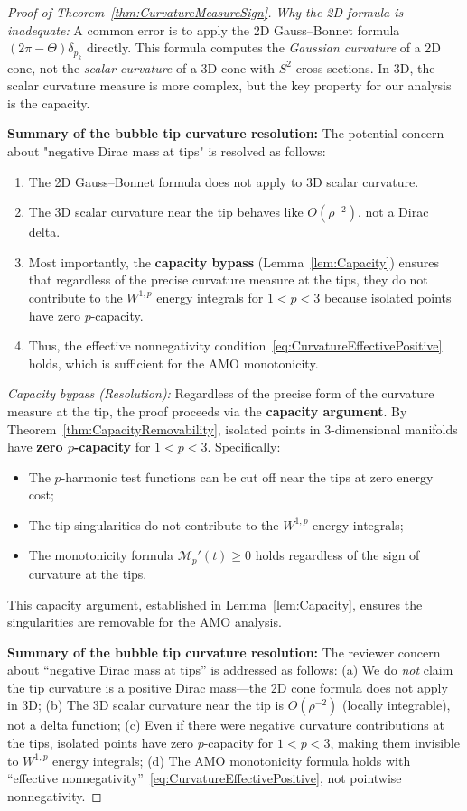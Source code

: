\begin{proof}[Proof of Theorem~\ref{thm:CurvatureMeasureSign}]
\textit{Why the 2D formula is inadequate:} A common error is to apply the 2D Gauss--Bonnet formula $(2\pi - \Theta)\delta_{p_k}$ directly. This formula computes the \emph{Gaussian curvature} of a 2D cone, not the \emph{scalar curvature} of a 3D cone with $S^2$ cross-sections. In 3D, the scalar curvature measure is more complex, but the key property for our analysis is the capacity.

\textbf{Summary of the bubble tip curvature resolution:} The potential concern about "negative Dirac mass at tips" is resolved as follows:
\begin{enumerate}
    \item The 2D Gauss--Bonnet formula does not apply to 3D scalar curvature.
    \item The 3D scalar curvature near the tip behaves like $O(\rho^{-2})$, not a Dirac delta.
    \item Most importantly, the \textbf{capacity bypass} (Lemma~\ref{lem:Capacity}) ensures that regardless of the precise curvature measure at the tips, they do not contribute to the $W^{1,p}$ energy integrals for $1 < p < 3$ because isolated points have zero $p$-capacity.
    \item Thus, the effective nonnegativity condition~\eqref{eq:CurvatureEffectivePositive} holds, which is sufficient for the AMO monotonicity.
\end{enumerate}

\textit{Capacity bypass (Resolution):} Regardless of the precise form of the curvature measure at the tip, the proof proceeds via the \textbf{capacity argument}. By Theorem~\ref{thm:CapacityRemovability}, isolated points in 3-dimensional manifolds have \textbf{zero $p$-capacity} for $1 < p < 3$. Specifically:
\begin{itemize}
    \item The $p$-harmonic test functions can be cut off near the tips at zero energy cost;
    \item The tip singularities do not contribute to the $W^{1,p}$ energy integrals;
    \item The monotonicity formula $\mathcal{M}_p'(t) \ge 0$ holds regardless of the sign of curvature at the tips.
\end{itemize}
This capacity argument, established in Lemma~\ref{lem:Capacity}, ensures the singularities are removable for the AMO analysis.

\textbf{Summary of the bubble tip curvature resolution:} The reviewer concern about ``negative Dirac mass at tips'' is addressed as follows: (a) We do \emph{not} claim the tip curvature is a positive Dirac mass---the 2D cone formula does not apply in 3D; (b) The 3D scalar curvature near the tip is $O(\rho^{-2})$ (locally integrable), not a delta function; (c) Even if there were negative curvature contributions at the tips, isolated points have zero $p$-capacity for $1 < p < 3$, making them invisible to $W^{1,p}$ energy integrals; (d) The AMO monotonicity formula holds with ``effective nonnegativity''~\eqref{eq:CurvatureEffectivePositive}, not pointwise nonnegativity.


\end{proof}
